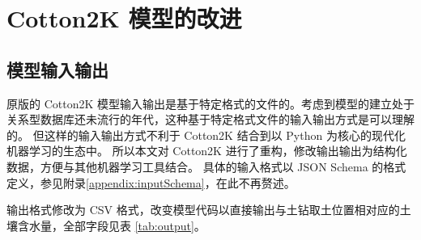 \chapter{Cotton2K 模型的改进}

\section{模型输入输出}

原版的 Cotton2K 模型输入输出是基于特定格式的文件的。考虑到模型的建立处于关系型数据库还未流行的年代，这种基于特定格式文件的输入输出方式是可以理解的。
但这样的输入输出方式不利于 Cotton2K 结合到以 Python 为核心的现代化机器学习的生态中。
所以本文对 Cotton2K 进行了重构，修改输出输出为结构化数据，方便与其他机器学习工具结合。
具体的输入格式以 JSON Schema 的格式定义，参见附录\ref{appendix:inputSchema}，在此不再赘述。

输出格式修改为 CSV 格式，改变模型代码以直接输出与土钻取土位置相对应的土壤含水量，全部字段见表 \ref{tab:output}。


